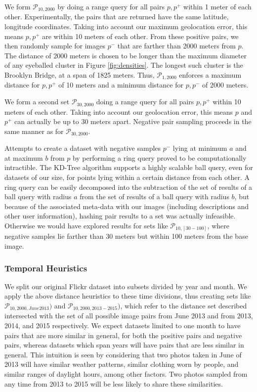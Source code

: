 We form $\mathcal{P}_{10, 2000}$ by doing a range query for all pairs $p, p^+$ within 1 meter of each other. Experimentally, the pairs that are returned have the same latitude, longitude coordinates. Taking into account our maximum geolocation error, this means $p, p^+$ are within 10 meters of each other. From these positive pairs, we then randomly sample for images $p^-$ that are farther than 2000 meters from $p$. The distance of 2000 meters is chosen to be longer than the maximum diameter of any eyeballed cluster in Figure \ref{fig:densities}. The longest such cluster is the Brooklyn Bridge, at a span of 1825 meters. Thus, $\mathcal{P}_{1,2000}$ enforces a maximum distance for $p, p^+$ of 10 meters and a minimum distance for $p, p^-$ of 2000 meters.

We form a second set $\mathcal{P}_{30,2000}$ doing a range query for all pairs $p, p^+$ within 10 meters of each other. Taking into account our geolocation error, this means $p$ and $p^+$ can actually be up to 30 meters apart. Negative pair sampling proceeds in the same manner as for $\mathcal{P}_{30,2000}$. 

Attempts to create a dataset with negative samples $p^-$ lying at minimum $a$ and at maximum $b$ from $p$ by performing a ring query proved to be computationally intractible. The KD-Tree algorithm supports a highly scalable ball query, even for datasets of our size, for points lying within a certain distance from each other. A ring query can be easily decomposed into the subtraction of the set of results of a ball query with radius $a$ from the set of results of a ball query with radius $b$, but because of the associated meta-data with our images (including descriptions and other user information), hashing pair results to a set was actually infeasible. Otherwise we would have explored results for sets like $\mathcal{P}_{10,[30-100]}$, where negative samples lie farther than 30 meters but within 100 meters from the base image.

\subsubsection{Temporal Heuristics}
We split our original Flickr dataset into subsets divided by year and month. We apply the above distance heuristics to these time divisions, thus creating sets like $\mathcal{P}_{10,2000,June2013})$ and $\mathcal{P}_{10,2000,2013-2015})$, which refer to the distance set described intersected with the set of all possible image pairs from June 2013 and from 2013, 2014, and 2015 respectively. We expect datasets limited to one month to have pairs that are more similar in general, for both the positive pairs and negative pairs, whereas datasets which span years will have pairs that are less similar in general. This intuition is seen by considering that two photos taken in June of 2013 will have similar weather patterns, similar clothing worn by people, and similar ranges of daylight hours, among other factors. Two photos sampled from any time from 2013 to 2015 will be less likely to share these similarities. 

